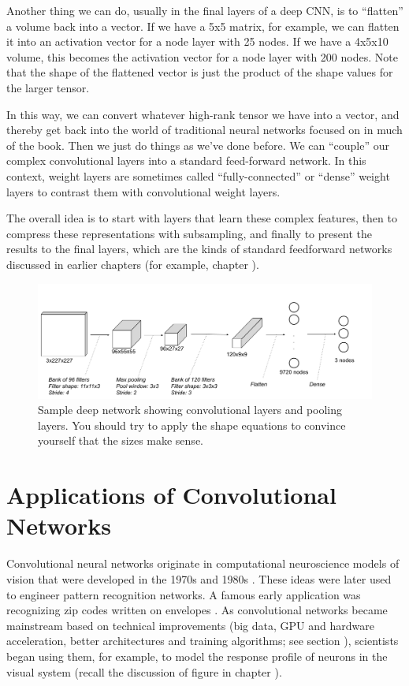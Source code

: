 Another thing we can do, usually in the final layers of a deep CNN, is to ``flatten'' a volume back into a vector. If we have a 5x5 matrix, for example, we can flatten it into an activation vector for a node layer with 25 nodes. If we have a 4x5x10 volume, this becomes the activation vector for a node layer with 200 nodes.  Note that the shape of the flattened vector is just the product of the shape values for the larger tensor.  

In this way, we can convert whatever high-rank tensor we have into a vector, and thereby get back into the world of  traditional neural networks focused on in much of the book.  Then we just do things as we've done before.  We can ``couple'' our complex convolutional layers into a standard feed-forward network.  In this context, weight layers are sometimes called ``fully-connected'' or ``dense'' weight layers to contrast them with convolutional weight layers.
	
The overall idea is to start with layers that learn these complex features, then to compress these representations with subsampling, and finally to present the results to the final layers, which are the kinds of standard feedforward networks discussed in earlier chapters (for example, chapter ).

\begin{figure}[h]
\centering
\includegraphics[scale=.45]{./images/deepNetExample.png}
\caption[Soraya Boza and Jeff Yoshimi ]{Sample deep network showing convolutional layers and pooling layers. You should try to apply the shape equations to convince yourself that the sizes make sense. }
\label{deepNetExample}
\end{figure}

\section{Applications of Convolutional Networks}\label{cnn_applications}

Convolutional neural networks originate in computational neuroscience models of vision that were developed in the 1970s and 1980s \cite{fukushima1982neocognitron}. These ideas were later used to engineer pattern recognition networks. A famous early application was recognizing zip codes written on envelopes \cite{lecun1989backpropagation}. As convolutional networks became mainstream based on technical improvements (big data, GPU and hardware acceleration, better architectures and training algorithms; see section ), scientists began using them, for example, to model the response profile of neurons in the visual system (recall the discussion of figure  in chapter ). 

